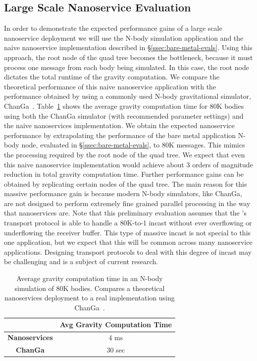 \subsection{Large Scale Nanoservice Evaluation}
In order to demonstrate the expected performance gains of a large scale nanoservice deployment we will use the N-body simulation application and the naive nanoservice implementation described in \S\ref{ssec:bare-metal-evals}.
Using this approach, the root node of the quad tree becomes the bottleneck, because it must process one message from each body being simulated.
In this case, the root node dictates the total runtime of the gravity computation.
We compare the theoretical performance of this naive nanoservice application with the performance obtained by using a commonly used N-body gravitational simulator, ChanGa~\cite{changa}.
Table~\ref{tab:nbody-changa} shows the average gravity computation time for 80K bodies using both the ChanGa simulator (with recommended parameter settings) and the naive nanoservices implementation.
We obtain the expected nanoservice performance by extrapolating the performance of the bare metal application N-body node, evaluated in \S\ref{ssec:bare-metal-evals}, to 80K messages.
This mimics the processing required by the root node of the quad tree.
We expect that even this naive nanoservice implementation would achieve about 3 orders of magnitude reduction in total gravity computation time.
Further performance gains can be obtained by replicating certain nodes of the quad tree.
The main reason for this massive performance gain is because modern N-body simulators, like ChanGa, are not designed to perform extremely fine grained parallel processing in the way that nanoservices are.
Note that this preliminary evaluation assumes that the \name{}'s transport protocol is able to handle a 80K-to-1 incast without ever overflowing or underflowing the receiver buffer.
This type of massive incast is not special to this one application, but we expect that this will be common across many nanoservice applications.
Designing transport protocols to deal with this degree of incast may be challenging and is a subject of current research.

\begin{table}
\begin{center}
\begin{tabular}{|c|c|}
\hline
                      & \textbf{Avg Gravity Computation Time} \\ \hline
\textbf{Nanoservices} & 4 ms                                  \\ \hline
\textbf{ChanGa}       & 30 sec                                \\ \hline
\end{tabular}
\caption{Average gravity computation time in an N-body simulation of 80K bodies. Compares a theoretical nanoservices deployment to a real implementation using ChanGa~\cite{changa}.}
\label{tab:nbody-changa}
\end{center}
\end{table}